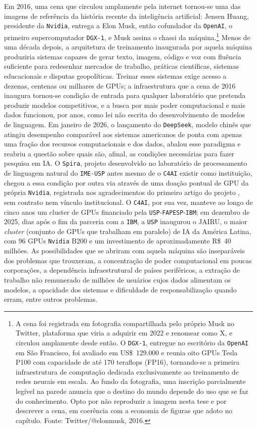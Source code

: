 Em 2016, uma cena que circulou amplamente pela internet tornou-se uma das imagens de referência da história recente da inteligência artificial: Jensen Huang, presidente da \texttt{Nvidia}, entrega a Elon Musk, então cofundador da \texttt{OpenAI}, o primeiro supercomputador \texttt{DGX-1}, e Musk assina o chassi da máquina.\footnote{A cena foi registrada em fotografia compartilhada pelo próprio Musk no Twitter, plataforma que viria a adquirir em 2022 e renomear como X, e circulou amplamente desde então. O \texttt{DGX-1}, entregue no escritório da \texttt{OpenAI} em São Francisco, foi avaliado em US\$~129.000 e reunia oito GPUs Tesla P100 com capacidade de até 170 teraflops (FP16), tornando-se a primeira infraestrutura de computação dedicada exclusivamente ao treinamento de redes neurais em escala. Ao fundo da fotografia, uma inscrição parcialmente legível na parede anuncia que o destino do mundo depende do uso que se faz do conhecimento. Opto por não reproduzir a imagem nesta tese e por descrever a cena, em coerência com a economia de figuras que adoto no capítulo. Fonte: Twitter/@elonmusk, 2016.} Menos de uma década depois, a arquitetura de treinamento inaugurada por aquela máquina produziria sistemas capazes de gerar texto, imagem, código e voz com fluência suficiente para redesenhar mercados de trabalho, práticas científicas, sistemas educacionais e disputas geopolíticas. Treinar esses sistemas exige acesso a dezenas, centenas ou milhares de GPUs; a infraestrutura que a cena de 2016 inaugura tornou-se condição de entrada para qualquer laboratório que pretenda produzir modelos competitivos, e a busca por mais poder computacional e mais dados funcionou, por anos, como lei não escrita do desenvolvimento de modelos de linguagem. Em janeiro de 2026, o lançamento do \texttt{DeepSeek}, modelo chinês que atingiu desempenho comparável aos sistemas americanos de ponta com apenas uma fração dos recursos computacionais e dos dados, abalou esse paradigma e reabriu a questão sobre quais são, afinal, as condições necessárias para fazer pesquisa em IA. O \texttt{Spira}, projeto desenvolvido no laboratório de processamento de linguagem natural do \texttt{IME-USP} antes mesmo de o \texttt{C4AI} existir como instituição, chegou a essa condição por outra via através de uma doação pontual de GPU da própria \texttt{Nvidia}, registrada nos agradecimentos do primeiro artigo do projeto \parencite{Casanova2021DeepLearning}, sem contrato nem vínculo institucional. O \texttt{C4AI}, por sua vez, manteve ao longo de cinco anos um cluster de GPUs financiado pela \texttt{USP}-\texttt{FAPESP}-\texttt{IBM}; em dezembro de 2025, dias após o fim da parceria com a \texttt{IBM}, a \texttt{USP} inaugurou o JAIRU, o maior \textit{cluster} (conjunto de GPUs que trabalham em paralelo) de IA da América Latina, com 96 GPUs \texttt{Nvidia} B200 e um investimento de aproximadamente R\$~40 milhões. As possibilidades que se abriram com aquela máquina são inseparáveis dos problemas que trouxeram, a concentração de poder computacional em poucas corporações, a dependência infraestrutural de países periféricos, a extração de trabalho não remunerado de milhões de usuários cujos dados alimentam os modelos, a opacidade dos sistemas e dificuldade de responsabilização quando erram, entre outros problemas. 

